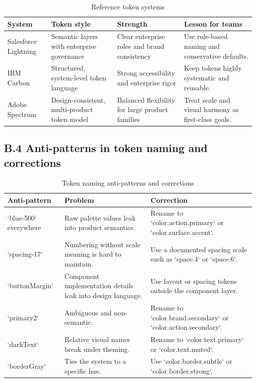 \begin{table}[htbp]
  \centering
  \caption{Reference token systems}
  \begin{tabularx}{\textwidth}{@{}p{}p{}p{}Y@{}}
    \toprule
    \textbf{System} & \textbf{Token style} & \textbf{Strength} & \textbf{Lesson for teams} \\
    \midrule
    Salesforce Lightning & Semantic layers with enterprise governance & Clear enterprise roles and brand consistency & Use role-based naming and conservative defaults. \\
    IBM Carbon & Structured, system-level token language & Strong accessibility and enterprise rigor & Keep tokens highly systematic and reusable. \\
    Adobe Spectrum & Design-consistent, multi-product token model & Balanced flexibility for large product families & Treat scale and visual harmony as first-class goals. \\
    \bottomrule
  \end{tabularx}
\end{table}

\subsection*{B.4 Anti-patterns in token naming and corrections}
\begin{table}[htbp]
  \centering
  \caption{Token naming anti-patterns and corrections}
  \begin{tabularx}{\textwidth}{@{}p{}p{}Y@{}}
    \toprule
    \textbf{Anti-pattern} & \textbf{Problem} & \textbf{Correction} \\
    \midrule
    `blue-500` everywhere & Raw palette values leak into product semantics. & Rename to `color.action.primary` or `color.surface.accent`. \\
    `spacing-17` & Numbering without scale meaning is hard to maintain. & Use a documented spacing scale such as `space.4` or `space.6`. \\
    `buttonMargin` & Component implementation details leak into design language. & Use layout or spacing tokens outside the component layer. \\
    `primary2` & Ambiguous and non-semantic. & Rename to `color.brand.secondary` or `color.action.secondary`. \\
    `darkText` & Relative visual names break under theming. & Rename to `color.text.primary` or `color.text.muted`. \\
    `borderGray` & Ties the system to a specific hue. & Use `color.border.subtle` or `color.border.strong`. \\
    \bottomrule
  \end{tabularx}
\end{table}

